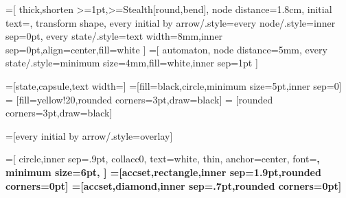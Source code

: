 \usetikzlibrary{automata}
\usetikzlibrary{arrows.meta}
\usetikzlibrary{bending}
\usetikzlibrary{shapes.callouts}
\usetikzlibrary{quotes}
\usetikzlibrary{positioning}
\usetikzlibrary{calc}

=[
  thick,shorten >=1pt,>={Stealth[round,bend]},
  node distance=1.8cm,
  initial text=,
  transform shape,
  every initial by arrow/.style={every node/.style={inner sep=0pt}},
  every state/.style={text width=8mm,inner sep=0pt,align=center,fill=white}
]
=[
  automaton,
  node distance=5mm,
  every state/.style={minimum size=4mm,fill=white,inner sep=1pt}
]

=[state,capsule,text width=]
=[fill=black,circle,minimum size=5pt,inner sep=0]
 = [fill=yellow!20,rounded corners=3pt,draw=black]
 = [rounded corners=3pt,draw=black]

\makeatletter
{}
\makeatother

=[every initial by arrow/.style={overlay}]


=[
  circle,inner sep=.9pt,
  collacc0, text=white,
  thin,
  anchor=center,
  font=\bfseries\sffamily\scriptsize,
  minimum size={6pt},
]
=[accset,rectangle,inner sep=1.9pt,rounded corners=0pt]
=[accset,diamond,inner sep=.7pt,rounded corners=0pt]

